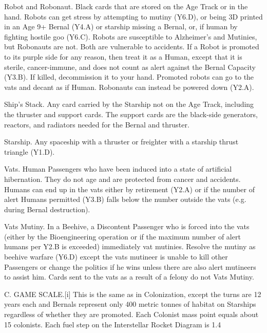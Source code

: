 \documentclass[a4paper]{book}
\begin{document}
Robot and Robonaut. Black cards that are stored on the Age Track or in the hand. Robots can get stress by attempting to mutiny (Y6.D), or being 3D printed in an Age 9+ Bernal (Y4.A) or starship missing a Bernal, or, if human by fighting hostile goo (Y6.C). Robots are susceptible to Alzheimer’s and Mutinies, but Robonauts are not. Both are vulnerable to accidents. If a Robot is promoted to its purple side for any reason, then treat it as a Human, except that it is sterile, cancer-immune, and does not count as alert against the Bernal Capacity (Y3.B). If killed, decommission it to your hand. Promoted robots can go to the vats and decant as if Human. Robonauts can instead be powered down (Y2.A).
 
Ship’s Stack. Any card carried by the Starship not on the Age Track, including the thruster and support cards. The support cards are the black-side generators, reactors, and radiators needed for the Bernal and thruster.
 
Starship. Any spaceship with a thruster or freighter with a starship thrust triangle (Y1.D).

Vats. Human Passengers who have been induced into a state of artificial hibernation. They do not age and are protected from cancer and accidents. Humans can end up in the vats either by retirement (Y2.A) or if the number of alert Humans permitted (Y3.B) falls below the number outside the vats (e.g. during Bernal destruction). 

Vats Mutiny. In a Beehive, a Discontent Passenger who is forced into the vats (either by the Bioengineering operation or if the maximum number of alert humans per Y2.B is exceeded) immediately vat mutinies. Resolve the mutiny as beehive warfare (Y6.D) except the vats mutineer is unable to kill other Passengers or change the politics if he wins unless there are also alert mutineers to assist him. Cards sent to the vats as a result of a felony do not Vats Mutiny.
 
C. GAME SCALE.[i]
This is the same as in Colonization, except the turns are 12 years each and Bernals represent only 400 metric tonnes of habitat on Starships regardless of whether they are promoted. Each Colonist mass point equals about 15 colonists. Each fuel step on the Interstellar Rocket Diagram is 1.4%
 
\end{document}
